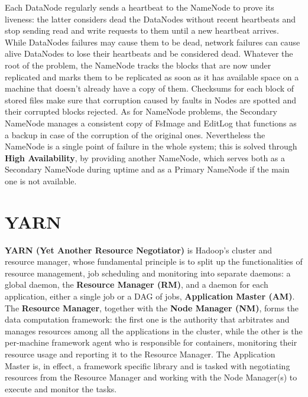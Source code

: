 Each DataNode regularly sends a heartbeat to the NameNode to prove its liveness: the latter considers dead the DataNodes without recent heartbeats and stop sending read and write requests to them until a new heartbeat arrives.\newline
While DataNodes failures may cause them to be dead, network failures can cause alive DataNodes to lose their heartbeats and be considered dead.\newline
Whatever the root of the problem, the NameNode tracks the blocks that are now under replicated and marks them to be replicated as soon as it has available space on a machine that doesn't already have a copy of them.\newline
Checksums for each block of stored files make sure that corruption caused by faults in Nodes are spotted and their corrupted blocks rejected.\newline
As for NameNode problems, the Secondary NameNode manages a consistent copy of FsImage and EditLog that functions as a backup in case of the corruption of the original ones. Nevertheless the NameNode is a single point of failure in the whole system; this is solved through \textbf{High Availability}, by providing another NameNode, which serves both as a Secondary NameNode during uptime and as a Primary NameNode if the main one is not available.

\pagebreak
\section{YARN} \label{YARN}

\textbf{YARN (Yet Another Resource Negotiator)} \cite{yarn_doc} is Hadoop's cluster and resource manager, whose fundamental principle is to split up the functionalities of resource management, job scheduling and monitoring into separate daemons: a global daemon, the \textbf{Resource Manager (RM)}, and a daemon for each application, either a single job or a DAG of jobs, \textbf{Application Master (AM)}.
\newline\newline
The \textbf{Resource Manager}, together with the \textbf{Node Manager (NM)}, forms the data computation framework: the first one is the authority that arbitrates and manages resources among all the applications in the cluster, while the other is the per-machine framework agent who is responsible for containers, monitoring their resource usage and reporting it to the Resource Manager.
\newline\newline
The Application Master is, in effect, a framework specific library and is tasked with negotiating resources from the Resource Manager and working with the Node Manager(s) to execute and monitor the tasks.


